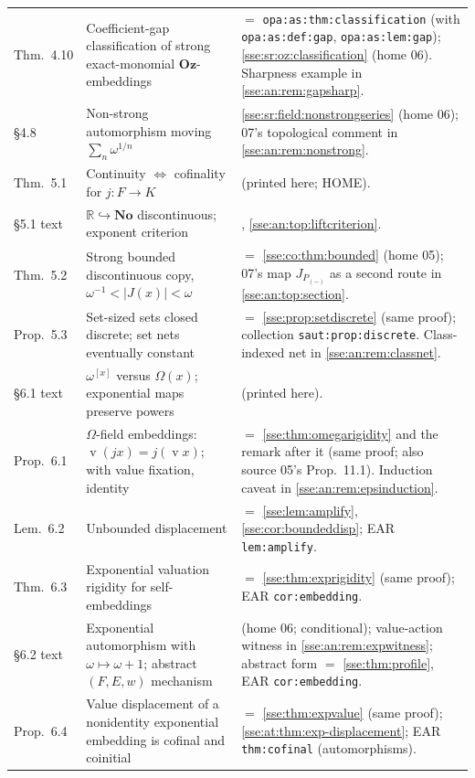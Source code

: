 \documentclass[11pt,a4paper]{article}
\numberwithin{equation}{section}
\theoremstyle{plain}
\theoremstyle{definition}
\theoremstyle{remark}
\newcommand{\No}{\mathbf{No}}
\newcommand{\Oz}{\mathbf{Oz}}
\newcommand{\R}{\mathbb{R}}
\newcommand{\val}{\operatorname{v}}
\newcommand{\lbl}[1]{\nolinkurl{#1}}%
\begin{document}
\begin{longtable}{P{17mm}P{60mm}P{73mm}}
Thm.~4.10 & Coefficient-gap classification of strong exact-monomial $\Oz$-embeddings & $=$ \lbl{opa:as:thm:classification} (with \lbl{opa:as:def:gap}, \lbl{opa:as:lem:gap}); \cref{sse:sr:oz:classification} (home 06). Sharpness example in \cref{sse:an:rem:gapsharp}. \\
\S4.8 & Non-strong automorphism moving $\sum_n\omega^{1/n}$ & \eqref{sse:sr:field:nonstrongseries} (home 06); 07's topological comment in \cref{sse:an:rem:nonstrong}. \\
Thm.~5.1 & Continuity $\iff$ cofinality for $j:F\to K$ &  (printed here; HOME). \\
\S5.1 text & $\R\hookrightarrow\No$ discontinuous; exponent criterion & , \eqref{sse:an:top:liftcriterion}. \\
Thm.~5.2 & Strong bounded discontinuous copy, $\omega^{-1}<|J(x)|<\omega$ & $=$ \cref{sse:co:thm:bounded} (home 05); 07's map $J_{P_{(-)}}$ as a second route in \cref{sse:an:top:section}. \\
Prop.~5.3 & Set-sized sets closed discrete; set nets eventually constant & $=$ \cref{sse:prop:setdiscrete} (same proof); collection \lbl{saut:prop:discrete}. Class-indexed net in \cref{sse:an:rem:classnet}. \\
\S6.1 text & $\omega^{[x]}$ versus $\Omega(x)$; exponential maps preserve powers &  (printed here). \\
Prop.~6.1 & $\Omega$-field embeddings: $\val(jx)=j(\val x)$; with value fixation, identity & $=$ \cref{sse:thm:omegarigidity} and the remark after it (same proof; also source 05's Prop.~11.1). Induction caveat in \cref{sse:an:rem:epsinduction}. \\
Lem.~6.2 & Unbounded displacement & $=$ \cref{sse:lem:amplify}, \cref{sse:cor:boundeddisp}; EAR \lbl{lem:amplify}. \\
Thm.~6.3 & Exponential valuation rigidity for self-embeddings & $=$ \cref{sse:thm:exprigidity} (same proof); EAR \lbl{cor:embedding}. \\
\S6.2 text & Exponential automorphism with $\omega\mapsto\omega+1$; abstract $(F,E,w)$ mechanism &  (home 06; conditional); value-action witness in \cref{sse:an:rem:expwitness}; abstract form $=$ \cref{sse:thm:profile}, EAR \lbl{cor:embedding}. \\
Prop.~6.4 & Value displacement of a nonidentity exponential embedding is cofinal and coinitial & $=$ \cref{sse:thm:expvalue} (same proof); \cref{sse:at:thm:exp-displacement}; EAR \lbl{thm:cofinal} (automorphisms). \\

\end{longtable}
\end{document}
